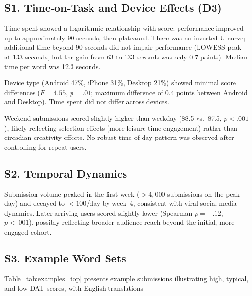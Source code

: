 \documentclass[12pt]{article}
\begin{document}
\subsection{S1. Time-on-Task and Device Effects (D3)}

Time spent showed a logarithmic relationship with score: performance improved up to approximately 90 seconds, then plateaued. There was no inverted U-curve; additional time beyond 90 seconds did not impair performance (LOWESS peak at 133 seconds, but the gain from 63 to 133 seconds was only 0.7 points). Median time per word was 12.3 seconds.

Device type (Android 47\%, iPhone 31\%, Desktop 21\%) showed minimal score differences ($F = 4.55$, $p = .01$; maximum difference of 0.4 points between Android and Desktop). Time spent did not differ across devices.

Weekend submissions scored slightly higher than weekday (88.5 vs.\ 87.5, $p < .001$), likely reflecting selection effects (more leisure-time engagement) rather than circadian creativity effects. No robust time-of-day pattern was observed after controlling for repeat users.

\subsection{S2. Temporal Dynamics}

Submission volume peaked in the first week ($> 4{,}000$ submissions on the peak day) and decayed to $< 100$/day by week~4, consistent with viral social media dynamics. Later-arriving users scored slightly lower (Spearman $\rho = -.12$, $p < .001$), possibly reflecting broader audience reach beyond the initial, more engaged cohort.

\subsection{S3. Example Word Sets}

Table~\ref{tab:examples_top} presents example submissions illustrating high, typical, and low DAT scores, with English translations.
\end{document}
